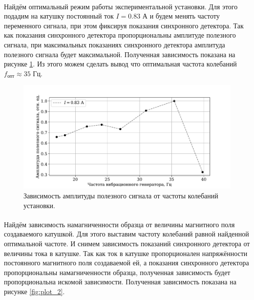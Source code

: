 \documentclass[a4paper,12pt]{article} %
\begin{document}
\paragraph{} Найдём оптимальный режим работы экспериментальной установки. Для этого подадим на катушку постоянный ток $I = 0.83$ А и будем менять частоту переменного сигнала, при этом фиксируя показания синхронного детектора. Так как показания синхронного детектора пропорциональны амплитуде полезного сигнала, при максимальных показаниях синхронного детектора амплитуда полезного сигнала будет максимальной. Полученная зависимость показана на рисунке \ref{fig:plot_1}. Из этого можем сделать вывод что оптимальная частота колебаний $f_\text{опт} \approx 35$ Гц.

\begin{figure}[h]
\centering
\includegraphics[width=\textwidth]{plot_1.pdf}
\caption{Зависимость амплитуды полезного сигнала от частоты колебаний установки.}
\label{fig:plot_1}
\end{figure}

\paragraph{} Найдём зависимость намагниченности образца от величины магнитного поля создаваемого катушкой. Для этого выставим частоту колебаний равной найденной оптимальной частоте. И снимем зависимость показаний синхронного детектора от величины тока в катушке. Так как ток в катушке пропорционален напряжённости постоянного магнитного поля создаваемой ей, а показания синхронного детектора пропорциональны намагниченности образца, полученная зависимость будет пропорциональна искомой зависимости. Полученная зависимость показана на рисунке \ref{fig:plot_2}.
\end{document}
